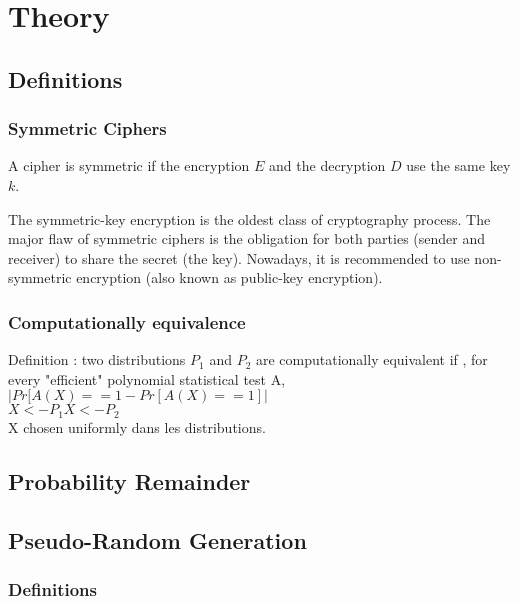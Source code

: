 \chapter{Theory}

\section{Definitions}

\subsection{Symmetric Ciphers}

\begin{mydef}
\begin{minipage}[t]{0.8\textwidth}
    A cipher is symmetric if the encryption $E$ and the decryption $D$ use the same key $k$.
\end{minipage}
\end{mydef}

The symmetric-key encryption is the oldest class of cryptography process. The major flaw of symmetric ciphers is the obligation for both parties (sender and receiver) to share the secret (the key). Nowadays, it is recommended to use non-symmetric encryption (also known as public-key encryption).

\subsection{Computationally equivalence}
Definition : two distributions $P_1$ and $P_2$ are computationally equivalent if , for every "efficient" polynomial statistical test A, \\

$ | Pr[A(X) == 1  - Pr[A(X) == 1] |  $ \\
$   X <- P_1      X <- P_2              $ \\
X chosen uniformly dans les distributions.

\section{Probability Remainder}

\section{ Pseudo-Random Generation }

\subsection{ Definitions }
